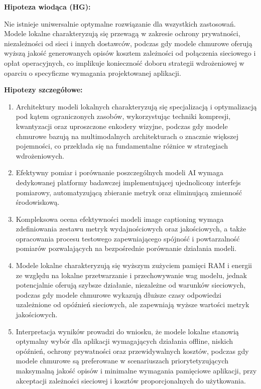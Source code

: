 \vspace{0.3cm}
\noindent
\textbf{Hipoteza wiodąca (HG):} 

Nie istnieje uniwersalnie optymalne rozwiązanie dla wszystkich zastosowań. Modele lokalne 
charakteryzują się przewagą w zakresie ochrony prywatności, niezależności od sieci i innych dostawców, 
podczas gdy modele chmurowe oferują wyższą jakość generowanych opisów kosztem zależności od połączenia 
sieciowego i opłat operacyjnych, co implikuje konieczność doboru strategii wdrożeniowej w oparciu 
o specyficzne wymagania projektowanej aplikacji.

\vspace{0.3cm}
\noindent
\textbf{Hipotezy szczegółowe:}

\begin{enumerate}[leftmargin=*, label=\textbf{H\arabic*.}, itemsep=3pt]
    \item Architektury modeli lokalnych charakteryzują się specjalizacją i optymalizacją pod kątem ograniczonych zasobów,
    wykorzystując techniki kompresji, kwantyzacji oraz uproszczone enkodery wizyjne,
    podczas gdy modele chmurowe bazują na multimodalnych architekturach o znacznie większej pojemności,
    co przekłada się na fundamentalne różnice w strategiach wdrożeniowych.
    
    \item Efektywny pomiar i porównanie poszczególnych modeli AI wymaga dedykowanej platformy badawczej 
    implementującej ujednolicony interfejs pomiarowy, automatyzującą zbieranie metryk oraz eliminującą 
    zmienność środowiskową.
    
    \item Kompleksowa ocena efektywności modeli image captioning wymaga zdefiniowania 
    zestawu metryk wydajnościowych oraz jakościowych, 
    a także opracowania procesu testowego zapewniającego spójność i powtarzalność pomiarów pozwalających na bezpośrednie porównanie działania modeli.
    
    \item Modele lokalne charakteryzują się wyższym zużyciem pamięci RAM i energii 
    ze względu na lokalne przetwarzanie i przechowywanie wag modelu, jednak potencjalnie 
    oferują szybsze działanie, niezależne od warunków sieciowych, podczas gdy modele 
    chmurowe wykazują dłuższe czasy odpowiedzi uzależnione od opóźnień sieciowych, 
    ale zapewniają wyższe wartości metryk jakościowych.
    
    \item Interpretacja wyników prowadzi do wniosku, że modele lokalne stanowią optymalny wybór 
    dla aplikacji wymagających działania offline, niskich opóźnień, ochrony prywatności 
    oraz przewidywalnych kosztów, podczas gdy modele chmurowe są preferowane w scenariuszach 
    priorytetyzujących maksymalną jakość opisów i minimalne wymagania 
    pamięciowe aplikacji, przy akceptacji zależności sieciowej i kosztów proporcjonalnych do użytkowania.
\end{enumerate}

